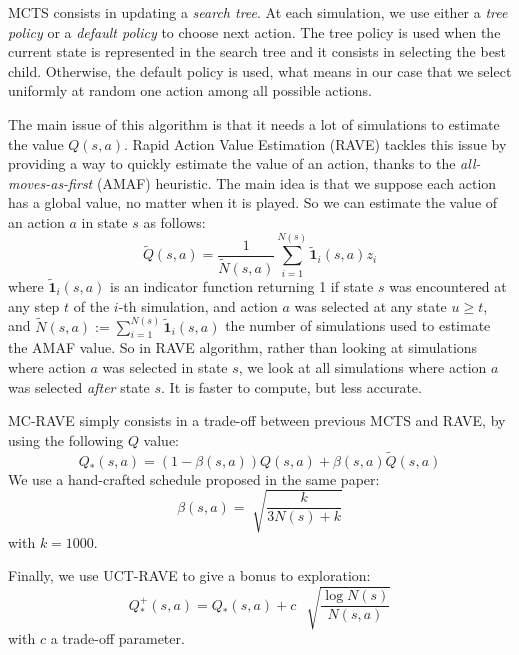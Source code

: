 \documentclass[journal, a4paper]{IEEEtran}
\begin{document}
MCTS consists in updating a \textit{search tree}. At each simulation, we use either a \textit{tree policy} or a \textit{default policy} to choose next action. The tree policy is used when the current state is represented in the search tree and it consists in selecting the best child. Otherwise, the default policy is used, what means in our case that we select uniformly at random one action among all possible actions.

The main issue of this algorithm is that it needs a lot of simulations to estimate the value $Q(s,a)$. Rapid Action Value Estimation (RAVE) \cite{mc-rave} tackles this issue by providing a way to quickly estimate the value of an action, thanks to the \textit{all-moves-as-first} (AMAF) heuristic. The main idea is that we suppose each action has a global value, no matter when it is played. So we can estimate the value of an action $a$ in state $s$ as follows:
$$\tilde Q(s,a) = \frac{1}{\tilde N(s,a)} \sum_{i=1}^{N(s)} \mathbf{\tilde 1}_{i}(s,a)z_i$$
where $\mathbf{\tilde 1}_{i}(s,a)$ is an indicator function returning 1 if state $s$ was encountered at any step $t$ of the $i$-th simulation, and action $a$ was selected at any state $u\geq t$, and $\tilde N(s,a):=\sum_{i=1}^{N(s)} \mathbf{\tilde 1}_{i}(s,a)$ the number of simulations used to estimate the AMAF value. So in RAVE algorithm, rather than looking at simulations where action $a$ was selected in state $s$, we look at all simulations where action $a$ was selected \textit{after} state $s$. It is faster to compute, but less accurate.

MC-RAVE \cite{mc-rave} simply consists in a trade-off between previous MCTS and RAVE, by using the following $Q$ value:
$$Q_*(s,a) = (1-\beta(s,a))Q(s,a) + \beta(s,a)\tilde Q(s,a)$$
We use a hand-crafted schedule proposed in the same paper:
$$\beta(s,a) = \sqrt[]{\frac{k}{3N(s)+k}}$$
with $k=1000$.

Finally, we use UCT-RAVE \cite{mc-rave} to give a bonus to exploration:
$$Q_*^+(s,a) = Q_*(s,a) + c\:\:\sqrt[]{\frac{\log N(s)}{N(s,a)}}$$
with $c$ a trade-off parameter.
\end{document}
